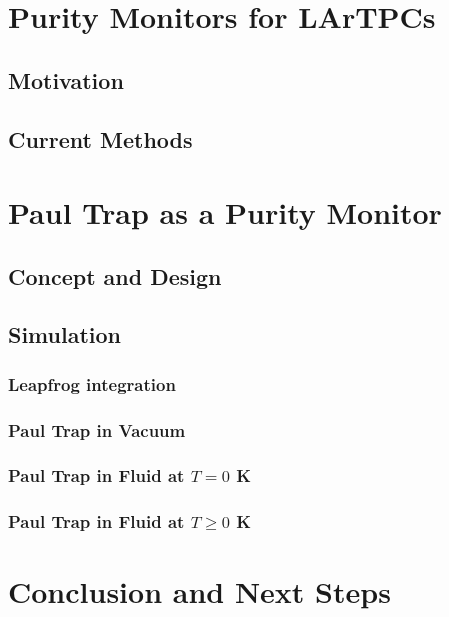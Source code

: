 \section{Purity Monitors for LArTPCs}
\subsection{Motivation}
\subsection{Current Methods}
\section{Paul Trap as a Purity Monitor}
\subsection{Concept and Design}
\subsection{Simulation}
\subsubsection{Leapfrog integration}
\subsubsection{Paul Trap in Vacuum}
\subsubsection{Paul Trap in Fluid at $T = 0$ K}
\subsubsection{Paul Trap in Fluid at $T \geqslant 0$ K}
\section{Conclusion and Next Steps}